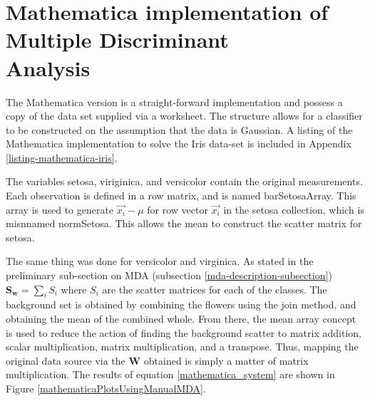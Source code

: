\documentclass[11pt]{article}
\begin{document}
\section{Mathematica implementation of Multiple Discriminant \\Analysis}
\label{mathematica-prototype-mda}
The Mathematica version is a straight-forward implementation and possess a copy of the data set supplied via a worksheet.  %
The structure allows for a classifier to be constructed on the assumption that the data is Gaussian.  A listing of the Mathematica implementation to solve the Iris data-set is included in Appendix \ref{listing-mathematica-iris}.

The variables setosa, viriginica, and versicolor  contain the original measurements.  Each observation is defined in a row matrix, and is named %
barSetosaArray.  This array is used to generate $\vec{x_i} - \mu$ for row vector $\vec{x_i}$ in the setosa collection, which is misnnamed  normSetosa.  This allows the mean to construct the scatter matrix for setosa.  

The same thing was done for versicolor and virginica.  As stated in the preliminary sub-section on MDA (subsection \ref{mda-description-subsection}) %
$\mathbf{S_w}=  \sum_i S_i$ where $S_i$ are the scatter matrices for each of the classes.  The background set is obtained by %
combining the flowers using the join method, %
and obtaining the mean of the combined whole.  From there, %
the mean array concept is used to reduce the action of finding the background scatter to matrix addition, scalar multiplication, matrix multiplication, and a transpose.  
Thus, mapping the original data source via the $\mathbf{W}$ obtained is simply a matter of matrix multiplication.  The results of equation \ref{mathematica_system} are shown in Figure \ref{mathematicaPlotsUsingManualMDA}.
\end{document}
